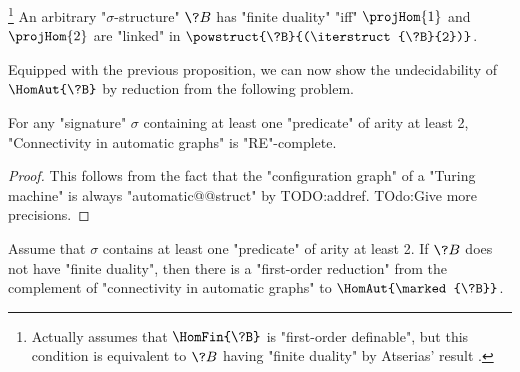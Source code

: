 \begin{proposition}%
	\!\footnote{Actually \cite[Theorem 4.7]{LaroseLotenTardif2007CharacterisationFOCSP} assumes
	that $\HomFin{\?B}$ is "first-order definable", but this condition
	is equivalent to $\?B$ having "finite duality" by Atserias' result
	\cite[Corollary 4]{Atserias2008DigraphColoring}.}%
	\AP\label{prop:characterization-finite-duality-path-projections}
	An arbitrary "$\sigma$-structure" $\?B$ has "finite duality" "iff"
	$\projHom{1}$ and $\projHom{2}$ are "linked" in $\powstruct{\?B}{(\iterstruct{\?B}{2})}$.
\end{proposition}

Equipped with the previous proposition, we can now show the undecidability 
of $\HomAut{\?B}$ by reduction from the following problem.

\begin{property}
	\AP\label{prop:undecidability-connectivity}
	For any "signature" $\sigma$ containing at least one "predicate" of
	arity at least 2, "Connectivity in automatic graphs" is "RE"-complete.
\end{property}

\begin{proof}
	This follows from the fact that the "configuration graph" of
	a "Turing machine" is always "automatic@@struct" by TODO:addref.
	TOdo:Give more precisions.
\end{proof}

\begin{lemma}
	\AP\label{lem:reduction-hom}
	Assume that $\sigma$ contains at least one "predicate" of arity at least 2.
	If $\?B$ does not have "finite duality", then there is a "first-order reduction" 
	from the complement of "connectivity in automatic graphs" to $\HomAut{\marked{\?B}}$.
\end{lemma}

\begin{marginfigure}
	\centering
	\begin{tikzpicture}
		
	\end{tikzpicture}
	\caption{
		\AP\label{fig:graph-to-struct-graph}
		A "graph@@dir" $\?G$.
	}
\end{marginfigure}
\begin{marginfigure}
	\centering
	\begin{tikzpicture}
		
	\end{tikzpicture}
	\caption{
		\AP\label{fig:graph-to-struct-struct}
		The "structure" $\?A$ defined from $\?G$ (in ),
		using the construction done in the proof of ,
		when $\sigma$ consists of a single binary relation.
	}
\end{marginfigure}

